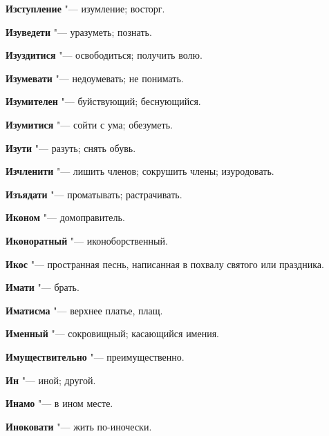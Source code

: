 \begin{mymulticols}{2}
\noindent\textbf{Изступление} "--- изумление; восторг. 




\noindent\textbf{Изуведети} "--- уразуметь; познать. 




\noindent\textbf{Изуздитися} "--- освободиться; получить волю. 




\noindent\textbf{Изумевати} "--- недоумевать; не понимать. 




\noindent\textbf{Изумителен} "--- буйствующий; беснующийся. 




\noindent\textbf{Изумитися} "--- сойти с ума; обезуметь. 




\noindent\textbf{Изути} "--- разуть; снять обувь. 




\noindent\textbf{Изчленити} "--- лишить членов; сокрушить члены; изуродовать. 




\noindent\textbf{Изъядати} "--- проматывать; растрачивать. 




\noindent\textbf{Иконом} "--- домоправитель. 




\noindent\textbf{Иконоратный} "--- иконоборственный. 




\noindent\textbf{Икос} "--- пространная песнь, написанная в похвалу святого или праздника. 




\noindent\textbf{Имати} "--- брать. 




\noindent\textbf{Иматисма} "--- верхнее платье, плащ. 




\noindent\textbf{Именный} "--- сокровищный; касающийся имения. 




\noindent\textbf{Имуществительно} "--- преимущественно. 




\noindent\textbf{Ин} "--- иной; другой. 




\noindent\textbf{Инамо} "--- в ином месте. 




\noindent\textbf{Иноковати} "--- жить по-иночески. 





\end{mymulticols}
